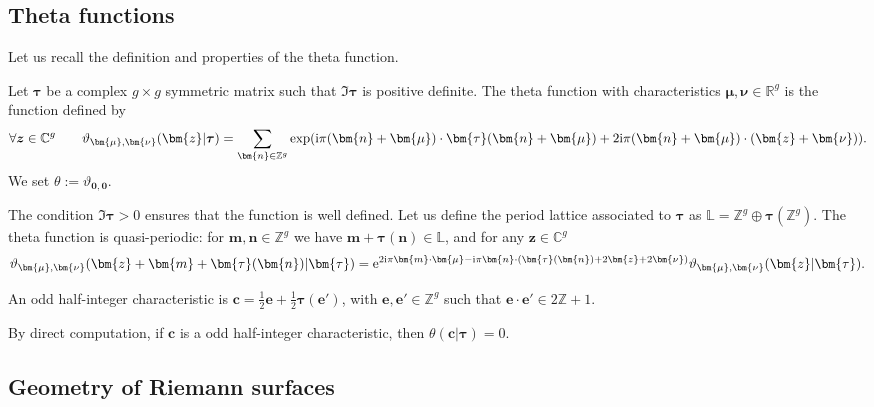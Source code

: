 \documentclass[pdftex]{sigma}
\numberwithin{equation}{section}
\newcommand{\ZZ}{\mathbb{Z}}
\newcommand{\CC}{\mathbb{C}}
\begin{document}
\subsection{Theta functions}
\label{sec:theta-function}

Let us recall the definition and properties of the theta function.
\begin{Definition}%
 Let $\bm{\tau}$ be a complex $g \times g$ symmetric matrix such that $\Im \boldsymbol{\tau}$ is positive definite. The
 theta function with characteristics
 $\boldsymbol{\mu},\boldsymbol{\nu} \in \mathbb{R}^{g}$ is the function defined by
\[
 \forall \boldsymbol{z} \in \mathbb{C}^{g} \qquad \vartheta_{\bm{\mu},\bm{\nu}}(\bm{z}|\boldsymbol{\tau}) = \sum_{\bm{n}\in\ZZ^{g}}\exp({\rm i}\pi(\bm{n}+\bm{\mu})\cdot \bm{\tau}(\bm{n}+\bm{\mu}) + 2{\rm i}\pi(\bm{n}+\bm{\mu})\cdot(\bm{z} + \bm{\nu})).
\]
We set $\theta := \vartheta_{\boldsymbol{0},\boldsymbol{0}}$.
\end{Definition}
The condition $\Im\bm{\tau} > 0$ ensures that the function is well
defined. Let us define the period lattice associated to $\bm{\tau}$ as $\mathbb{L} = \ZZ^{g} \oplus \bm{\tau}(\ZZ^{g})$. The theta function is quasi-periodic: for $\bm{m}, \bm{n}\in \ZZ^{g}$ we have
$\bm{m} + \bm{\tau}(\bm{n})\in\mathbb{L}$, and for any $\bm{z} \in \CC^{g}$
\begin{equation*}
 \vartheta_{\bm{\mu},\bm{\nu}} (\bm{z} + \bm{m} + \bm{\tau}(\bm{n}) |\bm{\tau} ) ={\rm e}^{2{\rm i}\pi \bm{m}\cdot \bm{\mu} - {\rm i}\pi\bm{n} \cdot (\bm{\tau}(\bm{n}) + 2\bm{z} + 2\bm{\nu})}\vartheta_{\bm{\mu},\bm{\nu}}(\bm{z}|\bm{\tau}).
\end{equation*}
\begin{Definition}
An odd half-integer characteristic is $\bm{c} = \frac{1}{2}\bm{e} + \frac{1}{2}\bm{\tau}(\bm{e}')$, with $\bm{e},\bm{e}' \in \ZZ^{g}$ such that $\bm{e} \cdot \bm{e}' \in 2\mathbb{Z} + 1$.
 \end{Definition}
 By direct computation, if $\bm{c}$ is a odd half-integer characteristic, then $\theta(\bm{c}|\bm{\tau}) = 0$.



\subsection{Geometry of Riemann surfaces}
\end{document}
